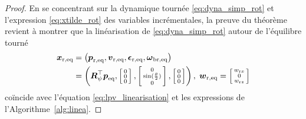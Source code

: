 \begin{proof}
En se concentrant sur la dynamique tournée \eqref{eq:dyna_simp_rot} et l'expression \eqref{eq:xtilde_rot} des variables incrémentales, la preuve du théorème revient à montrer que la linéarisation de \eqref{eq:dyna_simp_rot} autour de
l'équilibre tourné
\begin{align}
\label{eq:rotated_eq}
\boldsymbol{x}_{\text{r,eq}} &= \left( \boldsymbol{p}_{\text{r,eq}}, \boldsymbol{v}_{\text{r,eq}},
\boldsymbol{\epsilon}_{\text{r,eq}},
\boldsymbol{\omega}_{\text{br,eq}} \right) \\
\nonumber
&= \left(\boldsymbol{R}^\top_{\psi} \boldsymbol{p}_{\text{eq}},  
\left[ \begin{smallmatrix}0 \\ 0 \\ 0 \end{smallmatrix} \right],   \left[ \begin{smallmatrix}0 \\ \sin(\frac{\theta}{2}) \\ 0 \end{smallmatrix} \right], 
\left[ \begin{smallmatrix}0 \\ 0 \\ 0 \end{smallmatrix} \right] \right),\;
\boldsymbol{w}_{\mathrm{r,eq}}  = \left[ \begin{smallmatrix}w_{\text{r}x} \\ 0 \\w_{\text{r}z} \end{smallmatrix} \right]
\end{align}
coïncide avec l'équation \eqref{eq:lpv_linearisation} et les expressions de l'Algorithme~\ref{alg:linea}.


\end{proof}
